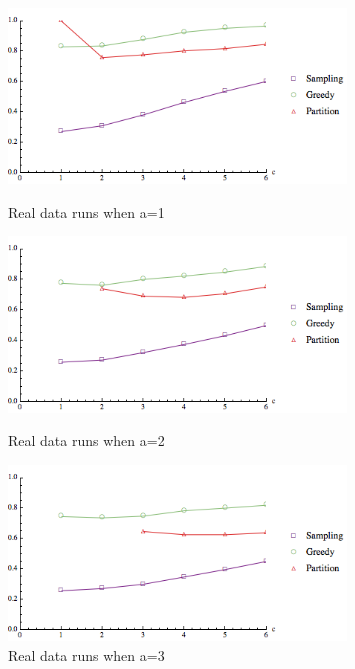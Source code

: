 \begin{figure}[t]
\centering
\begin{minipage}[h]{0.48\textwidth}
\centering
\includegraphics[width=0.8\textwidth]{images/real_a=1.png}
\caption{Real data runs when a=1}\label{fig:real_a=1}
\end{minipage}
\hspace{0cm}
\begin{minipage}[h]{0.48\textwidth}
\centering
\includegraphics[width=0.8\textwidth]{images/real_a=2.png}
\caption{Real data runs when a=2}\label{fig:real_a=2}
\end{minipage}
\hspace{0cm}
\centering
\begin{minipage}[h]{0.48\textwidth}
\centering
\includegraphics[width=0.8\textwidth]{images/real_a=3.png}
\caption{Real data runs when a=3}\label{fig:real_a=3}
\end{minipage}
\vspace{-0.2in}
\end{figure} \vs

